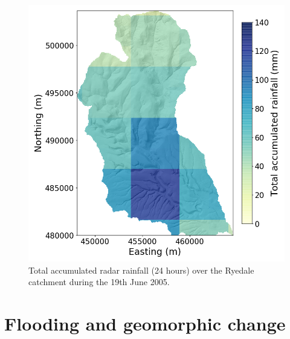 
\begin{figure}[htb]
\includegraphics[width=13cm]{chp_events_figures_scripts/figure_ryedale_total_rainfall.png}
\caption{Total accumulated radar rainfall (24 hours) over the Ryedale catchment during the 19th June 2005.}
\label{fig_ryedale_rain_totals}
\end{figure}

\section{Flooding and geomorphic change}

